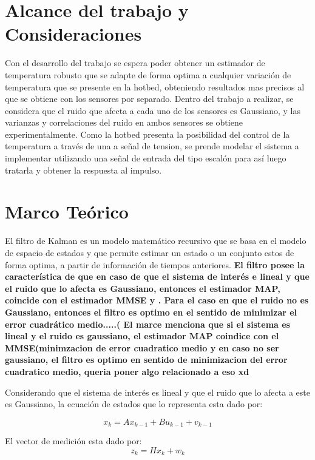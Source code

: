 \documentclass[journal]{IEEEtran}
\begin{document}
\section{Alcance del trabajo y Consideraciones}
Con el desarrollo del trabajo se espera poder obtener un estimador de temperatura robusto que se adapte de forma optima a cualquier variación de temperatura que se presente en la hotbed, obteniendo resultados mas precisos al que se obtiene con los sensores por separado.
Dentro del trabajo a realizar, se considera que el ruido que afecta a cada uno de los sensores es Gaussiano, y las varianzas y correlaciones del ruido en ambos sensores se obtiene experimentalmente. Como la hotbed presenta la posibilidad del control de la temperatura a través de una a señal de tension, se prende modelar el sistema a implementar utilizando una señal de entrada del tipo escalón para así luego tratarla y obtener la respuesta al impulso.

\section{Marco Teórico}
El filtro de Kalman es un modelo matemático recursivo que se basa en el modelo de espacio de estados y que permite estimar un estado o un conjunto estos de forma optima, a partir de  información de tiempos anteriores. \textbf{El filtro posee la característica de que en caso de que el sistema de interés e lineal y que el ruido que lo afecta es Gaussiano, entonces el estimador MAP, coincide con el estimador MMSE y . Para el caso en que el ruido no es Gaussiano, entonces el filtro es optimo en el sentido de minimizar el error cuadrático medio.....( El marce menciona que si el sistema es lineal y el ruido es gaussiano, el estimador MAP coindice con el MMSE(minimzacion de error cuadratico medio y en caso no ser gaussiano, el filtro es optimo en sentido de minimizacion del error cuadratico medio, queria poner algo relacionado a eso xd}

Considerando que el sistema de interés es lineal y que el ruido que lo afecta a este es Gaussiano, la ecuación de estados que lo representa esta dado por: 

\begin{equation}
x_{k}=Ax_{k-1}+Bu_{k-1}+v_{k-1}
\label{eq:1}
\end{equation}


El vector de medición esta dado por:
\begin{equation}
z_{k}=Hx_{k}+w_{k}
\label{eq:2}
\end{equation}
\end{document}
